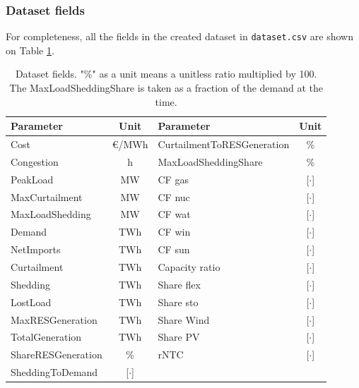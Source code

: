 \subsubsection{Dataset fields}

For completeness, all the fields in the created dataset in \texttt{dataset.csv} are shown on Table \ref{table:dataset-fields}.

\begin{table}[h]
    \centering
	\begin{tabular}{|l c|l c|}
		\hline
		Parameter & Unit & Parameter & Unit \\
		\hline
		Cost             & €/MWh & CurtailmentToRESGeneration & \% \\
		Congestion       & h     & MaxLoadSheddingShare & \% \\
		PeakLoad         & MW    & CF gas         & [$\cdot$] \\
		MaxCurtailment   & MW    & CF nuc         & [$\cdot$] \\
		MaxLoadShedding  & MW    & CF wat         & [$\cdot$] \\
		Demand           & TWh   & CF win         & [$\cdot$] \\
		NetImports       & TWh   & CF sun         & [$\cdot$] \\
		Curtailment      & TWh   & Capacity ratio & [$\cdot$] \\
		Shedding         & TWh   & Share flex     & [$\cdot$] \\
		LostLoad         & TWh   & Share sto      & [$\cdot$] \\
        MaxRESGeneration & TWh   & Share Wind     & [$\cdot$] \\
        TotalGeneration  & TWh   & Share PV       & [$\cdot$] \\
        ShareRESGeneration & \%  & rNTC           & [$\cdot$] \\
        SheddingToDemand & [$\cdot$] & & \\
		\hline
	\end{tabular}
	\caption{Dataset fields. "\%" as a unit means a unitless ratio multiplied by 100. The MaxLoadSheddingShare is taken as a fraction of the demand at the time.}
	\label{table:dataset-fields} 
\end{table}